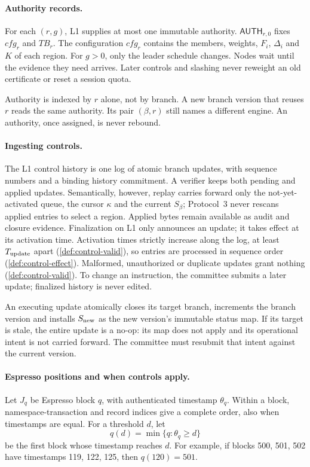 \documentclass[11pt,a4paper]{article}
\newcommand{\TB}{\mathit{TB}}
\newcommand{\tagg}[1]{\ensuremath{\mathsf{#1}}}
\begin{document}
\paragraph{Authority records.}
For each $(r,g)$, L1 supplies at most one immutable authority.
$\tagg{AUTH}_{r,0}$ fixes $\mathit{cfg}_r$ and $\TB_r$. The configuration
$\mathit{cfg}_r$ contains the members, weights, $F_i$, $\Delta_i$ and $K$
of each region. For $g>0$, only the leader schedule changes. Nodes wait
until the evidence they need arrives. Later controls and slashing never
reweight an old certificate or reset a session quota.

Authority is indexed by $r$ alone, not by branch. A new branch version
that reuses $r$ reads the same authority. Its pair $(\beta,r)$ still
names a different engine. An authority, once assigned, is never
rebound.

\paragraph{Ingesting controls.}
The L1 control history is one log of atomic branch updates, with sequence
numbers and a binding history commitment. A verifier keeps both pending
and applied updates. Semantically, however, replay carries forward only
the not-yet-activated queue, the cursor $\kappa$ and the current
$S_\beta$; Protocol~3 never rescans applied entries to select a region.
Applied bytes remain available as audit and closure evidence. Finalization
on L1 only announces an update; it takes effect at its activation time.
Activation times strictly increase
along the log, at least $T_{\rm update}$ apart (\cref{def:control-valid}),
so entries are processed in sequence order (\cref{def:control-effect}). Malformed, unauthorized or duplicate updates
grant nothing (\cref{def:control-valid}). To change an instruction, the
committee submits a later update; finalized history is never edited.

An executing update atomically closes its target branch, increments the
branch version and installs $S_{\rm new}$ as the new version's immutable
status map.  If its target is stale, the entire update is a no-op: its
map does not apply and its operational intent is not carried forward.
The committee must resubmit that intent against the current version.

\paragraph{Espresso positions and when controls apply.}
Let $J_q$ be Espresso block $q$, with authenticated timestamp $\theta_q$.
Within a block, namespace-transaction and record indices give a complete
order, also when timestamps are equal. For a threshold $d$, let
\[
 q(d)=\min\{q:\theta_q\ge d\}
\]
be the first block whose timestamp reaches $d$. For example, if blocks
500, 501, 502 have timestamps 119, 122, 125, then $q(120)=501$.
\end{document}
